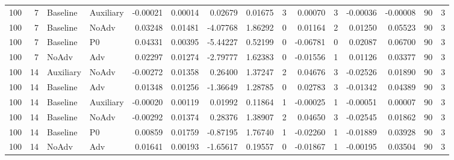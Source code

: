 \begin{longtable}{rrllrrrrrrrrrrr}
100 & 7 & Baseline & Auxiliary & -0.00021 & 0.00014 & 0.02679 & 0.01675 & 3 & 0.00070 & 3 & -0.00036 & -0.00008 & 90 & 3 \\
100 & 7 & Baseline & NoAdv & 0.03248 & 0.01481 & -4.07768 & 1.86292 & 0 & 0.01164 & 2 & 0.01250 & 0.05523 & 90 & 3 \\
100 & 7 & Baseline & P0 & 0.04331 & 0.00395 & -5.44227 & 0.52199 & 0 & -0.06781 & 0 & 0.02087 & 0.06700 & 90 & 3 \\
100 & 7 & NoAdv & Adv & 0.02297 & 0.01274 & -2.79777 & 1.62383 & 0 & -0.01556 & 1 & 0.01126 & 0.03377 & 90 & 3 \\
100 & 14 & Auxiliary & NoAdv & -0.00272 & 0.01358 & 0.26400 & 1.37247 & 2 & 0.04676 & 3 & -0.02526 & 0.01890 & 90 & 3 \\
100 & 14 & Baseline & Adv & 0.01348 & 0.01256 & -1.36649 & 1.28785 & 0 & 0.02783 & 3 & -0.01342 & 0.04389 & 90 & 3 \\
100 & 14 & Baseline & Auxiliary & -0.00020 & 0.00119 & 0.01992 & 0.11864 & 1 & -0.00025 & 1 & -0.00051 & 0.00007 & 90 & 3 \\
100 & 14 & Baseline & NoAdv & -0.00292 & 0.01374 & 0.28376 & 1.38907 & 2 & 0.04650 & 3 & -0.02545 & 0.01862 & 90 & 3 \\
100 & 14 & Baseline & P0 & 0.00859 & 0.01759 & -0.87195 & 1.76740 & 1 & -0.02260 & 1 & -0.01889 & 0.03928 & 90 & 3 \\
100 & 14 & NoAdv & Adv & 0.01641 & 0.00193 & -1.65617 & 0.19557 & 0 & -0.01867 & 1 & -0.00195 & 0.03504 & 90 & 3 \\
\end{longtable}
